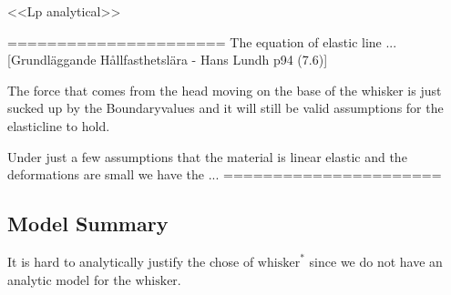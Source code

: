     <<Lp analytical>>


======================
The equation of elastic line ... [Grundläggande Hållfasthetslära - Hans Lundh
p94 (7.6)]

The force that comes from the head moving on the base of the whisker is just 
sucked up by the Boundaryvalues and it will still be valid assumptions for the
elasticline to hold.

Under just a few assumptions that the material is linear elastic and the
deformations are small we have the ...
======================


\subsection{Model Summary}
    It is hard to analytically justify the chose of $\text{whisker}^*$ since we do not
    have an analytic model for the $\text{whisker}$.




